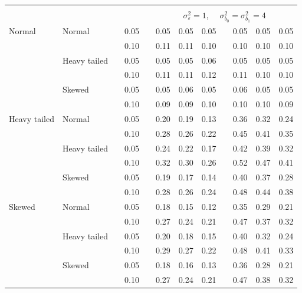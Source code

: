 \documentclass[12pt]{article} %
\begin{document}
\begin{table}[ht]
\begin{scriptsize}
\begin{center}
\begin{tabular}{ll p{.1cm} c p{.1cm} rrr p{.1cm} rrr}
&&&&&&&&&&&\\
& && && \multicolumn{7}{c}{$\sigma_{\varepsilon}^2 = 1$, \ \ $\sigma_{b_0}^2 = \sigma_{b_1}^2 = 4$} \\ \cline{6-12}
Normal       & Normal       && 0.05 &&  0.05 & 0.05 & 0.05 && 0.05 & 0.05 & 0.05 \\ 
             &              && 0.10 &&  0.11 & 0.11 & 0.10 && 0.10 & 0.10 & 0.10 \\ 
             & Heavy tailed && 0.05 &&  0.05 & 0.05 & 0.06 && 0.05 & 0.05 & 0.05 \\ 
             &              && 0.10 &&  0.11 & 0.11 & 0.12 && 0.11 & 0.10 & 0.10 \\ 
             & Skewed       && 0.05 &&  0.05 & 0.06 & 0.05 && 0.06 & 0.05 & 0.05 \\ 
             &              && 0.10 &&  0.09 & 0.09 & 0.10 && 0.10 & 0.10 & 0.09 \\ 
Heavy tailed & Normal       && 0.05 &&  0.20 & 0.19 & 0.13 && 0.36 & 0.32 & 0.24 \\ 
             &              && 0.10 &&  0.28 & 0.26 & 0.22 && 0.45 & 0.41 & 0.35 \\ 
             & Heavy tailed && 0.05 &&  0.24 & 0.22 & 0.17 && 0.42 & 0.39 & 0.32 \\ 
             &              && 0.10 &&  0.32 & 0.30 & 0.26 && 0.52 & 0.47 & 0.41 \\ 
             & Skewed       && 0.05 &&  0.19 & 0.17 & 0.14 && 0.40 & 0.37 & 0.28 \\ 
             &              && 0.10 &&  0.28 & 0.26 & 0.24 && 0.48 & 0.44 & 0.38 \\ 
Skewed       & Normal       && 0.05 &&  0.18 & 0.15 & 0.12 && 0.35 & 0.29 & 0.21 \\ 
             &              && 0.10 &&  0.27 & 0.24 & 0.21 && 0.47 & 0.37 & 0.32 \\ 
             & Heavy tailed && 0.05 &&  0.20 & 0.18 & 0.15 && 0.40 & 0.32 & 0.24 \\ 
             &              && 0.10 &&  0.29 & 0.27 & 0.22 && 0.48 & 0.41 & 0.33 \\ 
             & Skewed       && 0.05 &&  0.18 & 0.16 & 0.13 && 0.36 & 0.28 & 0.21 \\ 
             &              && 0.10 &&  0.27 & 0.24 & 0.21 && 0.47 & 0.38 & 0.32 \\ 

\hline
\end{tabular}
\end{center}
\end{scriptsize}
\end{table}
\end{document}
